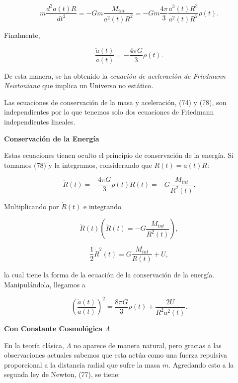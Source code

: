 \documentclass[11pt]{article}
\begin{document}
    \begin{equation}
        m \frac{d^2 a(t)R}{dt^2} = - Gm \frac{M_{int}}{a^2(t)R^2} = -Gm \frac{4\pi}{3}\frac{a^3(t)R^3}{a^2(t)R^2}\rho(t).
    \end{equation}
    
    Finalmente, 
    
    \begin{equation}
        \boxed{\frac{\ddot{a}(t)}{a(t)} = - \frac{4\pi G}{3}  \rho(t).}
    \end{equation}
    
    De esta manera, se ha obtenido la {\textit{ecuación de aceleración de Friedmann Newtoniana}} que implica un Universo no estático. 
    
    Las ecuaciones de conservación de la masa y aceleración, (74) y (78), son independientes por lo que tenemos solo dos ecuaciones de Friedmann independientes lineales. 
    
    \large{\bf{Conservación de la Energía}}
    
    Estas ecuaciones tienen oculto el principio de conservación de la energía. Si tomamos (78) y la integramos, considerando que $R(t) = a(t) R$: 
    
    \begin{equation}
        \ddot{R}(t) = - \frac{4\pi G}{3} \rho(t) R(t)   = - G \frac{M_{int} }{R^2(t)}.
    \end{equation}
    
    Multiplicando por $\dot{R}(t)$ e integrando 
    
   \[
  \dot{R}(t) \left( \ddot{R}(t) = - G \frac{M_{int} }{R^2(t)} \right),
  \]
    
    
    \begin{equation}
       \frac{1}{2}  \dot{R}^2(t)  = G \frac{M_{int} }{R(t)} + U,
    \end{equation}
    
    la cual tiene la forma de la ecuación de la conservación de la energía. Manipulándola, llegamos a 
    
    \begin{equation}
        \boxed{\left(\frac{\dot{a}(t)}{a(t)} \right)^2 = \frac{8\pi G}{3} \rho(t) + \frac{2U}{R^2 a^2(t)}.}
    \end{equation}
    
    \large{\bf{Con Constante Cosmológica $\Lambda$}}
    
    En la teoría clásica, $\Lambda$ no aparece de manera natural, pero gracias a las observaciones actuales sabemos que esta actúa como una fuerza repulsiva proporcional a la distancia radial que sufre la masa $m$. Agredando esto a la segunda ley de Newton, (77), se tiene: 
    
\end{document}
